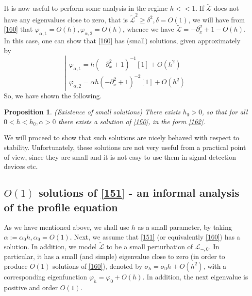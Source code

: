 \documentclass[12pt]{amsart}
\newtheorem{proposition}{Proposition}
\theoremstyle{definition}
\theoremstyle{remark}
\numberwithin{equation}{section}
\renewcommand{\(}{\left(}
\renewcommand{\)}{\right)}
\renewcommand{\[}{\left[}
\renewcommand{\]}{\right]}
\newcommand{\cl}{{\mathcal L}}
\newcommand{\al}{\alpha}
\newcommand{\de}{\delta}
\newcommand{\si}{\sigma}
\newcommand{\vp}{\varphi}
\newcommand{\tcl}{\tilde{\cl}}
\newcommand{\p}{\partial}
\begin{document}
 It is now useful to perform some analysis in the regime $h<<1$. If $\tcl$ does not have any eigenvalues close to zero, that is $\tcl^2\geq \de^2, \de=O(1)$, we will have from \eqref{160} that $\vp_{\al,1}=O(h), \vp_{\al,2}=O(h)$, whence we have $\tcl=-\p_x^2+1-O(h)$. In this case, one can show that \eqref{160} has (small) solutions, given approximately by
 \begin{equation}
 \label{162}
 \left| \begin{array}{l}
\vp_{\al,1}=h (-\p_x^2+1)^{-1}[1]+O(h^2) \\
 \vp_{\al,2}= \al h (-\p_x^2+1)^{-2} [1]+O(h^2)
 \end{array} \right.
 \end{equation}
 So, we have shown the following.
 \begin{proposition}(Existence of small solutions)
 	There exists $h_0>0$, so that for all $0<h<h_0, \al>0$ there exists a solution of \eqref{160}, in the form \eqref{162}.
 \end{proposition}
 We will proceed to show that such solutions are nicely behaved with respect to stability. Unfortunately, these solutions are not very useful from a practical point of view, since they are small and it is not easy to use them in signal detection devices etc.
 \subsection{$O(1)$ solutions of \eqref{151} - an informal analysis of the profile equation}

 As we have mentioned above, we shall use $h$ as a small parameter, by taking $\al:=\al_0 h, \al_0=O(1)$.  Next, we assume that \eqref{151} (or equivalently \eqref{160}) has a solution.  In addition, we model  $\tcl$ to be a small perturbation of $\cl_{-,0}$. In particular, it has a small (and simple) eigenvalue close to zero (in order to produce $O(1)$ solutions of \eqref{160}), denoted by $\si_h=\si_0 h+O(h^2)$, with a corresponding eigenfunction $\vp_h=\vp_0+O(h)$. In addition, the next eigenvalue is positive and order $O(1)$.
\end{document}
